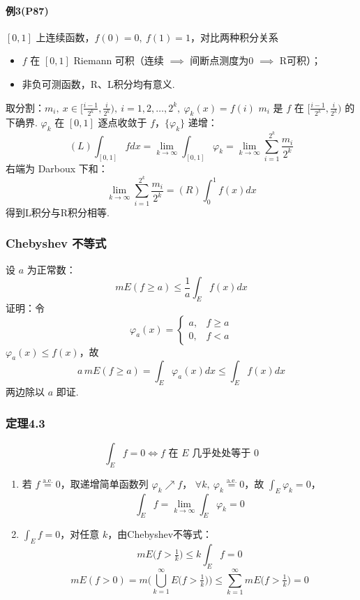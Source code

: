\documentclass{article}
\begin{document}
	\paragraph{例3(P87)} $[0,1]$ 上连续函数，$f(0)=0,\ f(1)=1$，对比两种积分关系
	\begin{itemize}
		\item $f$ 在 $[0,1]$ Riemann 可积（连续 $\implies$ 间断点测度为0 $\implies$ R可积）；
		\item 非负可测函数，R、L积分均有意义.
	\end{itemize}
	取分割：$m_i,\ x\in \big[\frac{i-1}{2^k},\frac{i}{2^k}\big),\ i=1,2,\dots,2^k,\ \varphi_k(x)=f(i)$
	$m_i$ 是 $f$ 在 $\big[\frac{i-1}{2^k},\frac{i}{2^k}\big)$ 的下确界.
	$\varphi_k$ 在 $[0,1]$ 逐点收敛于 $f$，$\{\varphi_k\}$ 递增：
	\[
	\displaystyle (L)\int_{[0,1]} f dx = \lim_{k\to\infty}\int_{[0,1]}\varphi_k
	= \lim_{k\to\infty}\sum_{i=1}^{2^k}\frac{m_i}{2^k}
	\]
	右端为 Darboux 下和：
	\[
	\displaystyle \lim_{k\to\infty}\sum_{i=1}^{2^k}\frac{m_i}{2^k} = (R)\int_0^1 f(x)dx
	\]
	得到L积分与R积分相等.
	
	\subsubsection{Chebyshev 不等式}
	设 $a$ 为正常数：
	\[
	\displaystyle mE(f\ge a) \le \frac1a \int_E f(x)dx
	\]
	证明：令
	\[
	\varphi_a(x) =
	\begin{cases}
		a, & f\ge a\\
		0, & f<a
	\end{cases}
	\]
	$\varphi_a(x)\le f(x)$，故
	\[
	a\,mE(f\ge a) = \int_E \varphi_a(x)dx \le \int_E f(x)dx
	\]
	两边除以 $a$ 即证.
	
	\subsubsection{定理4.3}
	\[
	\int_E f = 0 \iff f \text{ 在 } E \text{ 几乎处处等于 } 0
	\]
	\begin{enumerate}
		\item[$\Leftarrow$] 若 $f\overset{\text{a.e.}}{=}0$，取递增简单函数列 $\varphi_k\nearrow f$，
		$\forall k,\ \varphi_k\overset{\text{a.e.}}{=}0$，故 $\int_E \varphi_k=0$，
		\[
		\int_E f = \lim_{k\to\infty}\int_E \varphi_k = 0
		\]
		\item[$\Rightarrow$] $\int_E f=0$，对任意 $k$，由Chebyshev不等式：
		\[
		mE\big(f>\tfrac1k\big) \le k\int_E f = 0
		\]
		\[
		mE(f>0) = m\Big(\bigcup_{k=1}^\infty E\big(f>\tfrac1k\big)\Big)
		\le \sum_{k=1}^\infty mE\big(f>\tfrac1k\big) = 0
		\]
	\end{enumerate}
	
\end{document}
